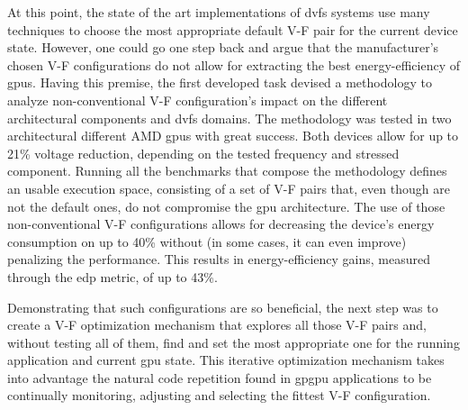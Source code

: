At this point, the state of the art implementations of \acrshort{dvfs} systems use many techniques to choose the most appropriate default V-F pair for the current device state. However, one could go one step back and argue that the manufacturer's chosen V-F configurations do not allow for extracting the best energy-efficiency of \acrshort{gpu}s. Having this premise, the first developed task devised a methodology to analyze non-conventional V-F configuration's impact on the different architectural components and \acrshort{dvfs} domains. The methodology was tested in two architectural different AMD \acrshort{gpu}s with great success. Both devices allow for up to 21\% voltage reduction, depending on the tested frequency and stressed component. Running all the benchmarks that compose the methodology defines an usable execution space, consisting of a set of V-F pairs that, even though are not the default ones, do not compromise the \acrshort{gpu} architecture. The use of those non-conventional V-F configurations allows for decreasing the device's energy consumption on up to 40\% without (in some cases, it can even improve) penalizing the performance. This results in energy-efficiency gains, measured through the \acrshort{edp} metric, of up to 43\%.

Demonstrating that such configurations are so beneficial, the next step was to create a V-F optimization mechanism that explores all those V-F pairs and, without testing all of them, find and set the most appropriate one for the running application and current \acrshort{gpu} state. This iterative optimization mechanism takes into advantage the natural code repetition found in \acrshort{gpgpu} applications to be continually monitoring, adjusting and selecting the fittest V-F configuration.

